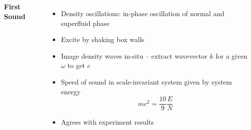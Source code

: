 \documentclass[26pt, paperwidth=36in,paperheight=48in]{tikzposter} %
\newcommand{\myfont}{\fontsize{24}{30}\selectfont}
\begin{document}
\begin{columns} 
	\block[]{\textcolor{BEC1blue}{Density Response -- First Sound [2]}}
	{
	\begin{minipage}{0.2\textwidth}
		\flushleft
		\vspace{0.5cm}
		\textbf{First Sound}
		\vspace{1cm}
		\myfont
		\begin{itemize}
			\item Density oscillations: in-phase oscillation of normal and superfluid phase
			
			\item Excite by shaking box walls
			
			\item Image density waves in-situ -- extract wavevector $k$ for a given $\omega$ to get $c$
			
			\item Speed of sound in scale-invariant system given by system energy $$mc^2 = \frac{10}{9} \frac{E}{N}$$
			
			\item Agrees with experiment results
		\end{itemize}
		

\end{minipage}}
\end{columns}
\end{document}

